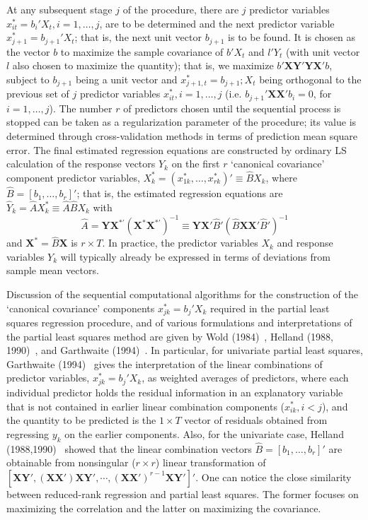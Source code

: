 At any subsequent stage $j$ of the procedure, there are $j$ predictor variables $x_{it}^*= b_i' X_t, i=1,\ldots, j$, are to be determined and the next predictor variable $x_{j+1}^*= b_{j+1}'X_t$; that is, the next unit vector $b_{j+1}$ is to be found. It is chosen as the vector $b$ to maximize the sample covariance of $b'X_t$ and $l' Y_t$ (with unit vector $l$ also chosen to maximize the quantity); that is, we maximize $b' \mathbf{XY'YX'}b$, subject to $b_{j+1}$ being a unit vector and $x_{j+1,t}^*=b_{j+1}; X_t$ being orthogonal to the previous set of $j$ predictor variables $x_{it}^*, i=1,\ldots,j$ (i.e. $b_{j+1}' \mathbf{XX'} b_i=0$, for $i=1,\ldots,j$). The number $r$ of predictors chosen until the sequential process is stopped can be taken as a regularization parameter of the procedure;\label{in:regz1} its value is determined through cross-validation methods in terms of prediction mean square error. The final estimated regression equations are constructed by ordinary LS calculation of the response vectors $Y_k$ on the first $r$ `canonical covariance' component predictor variables, $X_k^*= (x_{1k}^*,\ldots,x_{rk}^*)' \equiv \hat{B} X_k$, where $\hat{B}=[b_1,\ldots,b_r]'$; that is, the estimated regression equations are $\hat{Y}_k= \hat{A}X_k^* \equiv \hat{A}\hat{B} X_k$ with
	\[
	\hat{A}=\mathbf{YX}^{*'} (\mathbf{X}^* \mathbf{X}^{*'})^{-1} \equiv \mathbf{YX'} \hat{B}' (\hat{B} \mathbf{XX'} \hat{B}')^{-1}
	\]
and $\mathbf{X}^*=\hat{B}\mathbf{X}$ is $r \times T$. In practice, the predictor variables $X_k$ and response variables $Y_k$ will typically already be expressed in terms of deviations from sample mean vectors.


Discussion of the sequential computational algorithms for the construction of the `canonical covariance' components $x_{jk}^*=b_j'X_k$ required in the partial least squares regression procedure, and of various formulations and interpretations of the partial least squares method are given by Wold (1984)~\cite{wold}, Helland (1988, 1990)~\cite{helland88,helland90}, and Garthwaite (1994)~\cite{garth}. In particular, for univariate partial least squares, Garthwaite (1994)~\cite{garth} gives the interpretation of the linear combinations of predictor variables, $x_{jk}^*=b_j'X_k$, as weighted averages of predictors, where each individual predictor holds the residual information in an explanatory variable that is not contained in earlier linear combination components ($x_{ik}^*, i<j$), and the quantity to be predicted is the $1 \times T$ vector of residuals obtained from regressing $y_k$ on the earlier components. Also, for the univariate case, Helland (1988,1990)~\cite{helland88,helland90} showed that the linear combination vectors $\hat{B}=[b_1,\ldots,b_r]'$ are obtainable from nonsingular ($r \times r$) linear transformation of $[\mathbf{XY'},  (\mathbf{XX'})\mathbf{XY'}, \cdots, (\mathbf{XX'})^{r-1} \mathbf{XY'}]'$. One can notice the close similarity between reduced-rank regression and partial least squares. The former focuses on maximizing the correlation and the latter on maximizing the covariance.



